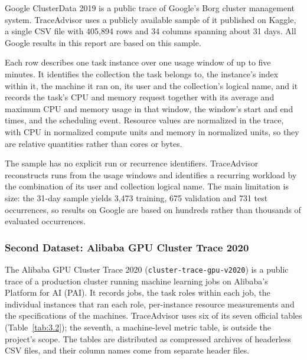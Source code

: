 \documentclass{IEEEtran}
\begin{document}
Google ClusterData 2019 is a public trace of Google's Borg cluster management system. TraceAdvisor uses a publicly available sample of it published on Kaggle, a single CSV file with 405,894 rows and 34 columns spanning about 31 days. All Google results in this report are based on this sample.

Each row describes one task instance over one usage window of up to five minutes. It identifies the collection the task belongs to, the instance's index within it, the machine it ran on, its user and the collection's logical name, and it records the task's CPU and memory request together with its average and maximum CPU and memory usage in that window, the window's start and end times, and the scheduling event. Resource values are normalized in the trace, with CPU in normalized compute units and memory in normalized units, so they are relative quantities rather than cores or bytes.

The sample has no explicit run or recurrence identifiers. TraceAdvisor reconstructs runs from the usage windows and identifies a recurring workload by the combination of its user and collection logical name. The main limitation is size: the 31-day sample yields 3,473 training, 675 validation and 731 test occurrences, so results on Google are based on hundreds rather than thousands of evaluated occurrences.

\subsubsection{Second Dataset: Alibaba GPU Cluster Trace 2020}\label{sec:3.3.2}

The Alibaba GPU Cluster Trace 2020 (\texttt{cluster-trace-gpu-v2020}) is a public trace of a production cluster running machine learning jobs on Alibaba's Platform for AI (PAI). It records jobs, the task roles within each job, the individual instances that ran each role, per-instance resource measurements and the specifications of the machines. TraceAdvisor uses six of its seven official tables (Table~\ref{tab:3.2}); the seventh, a machine-level metric table, is outside the project's scope. The tables are distributed as compressed archives of headerless CSV files, and their column names come from separate header files.
\end{document}
